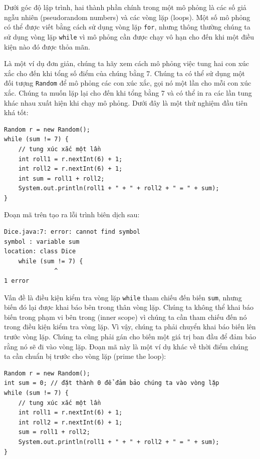 Dưới góc độ lập trình, hai thành phần chính trong một mô phỏng là các số giả ngẫu nhiên (pseudorandom numbers) và các vòng lặp (loops). Một số mô phỏng có thể được viết bằng cách sử dụng vòng lặp \texttt{for}, nhưng thông thường chúng ta sử dụng vòng lặp \texttt{while} vì mô phỏng cần được chạy vô hạn cho đến khi một điều kiện nào đó được thỏa mãn.

Là một ví dụ đơn giản, chúng ta hãy xem cách mô phỏng việc tung hai con xúc xắc cho đến khi tổng số điểm của chúng bằng 7. Chúng ta có thể sử dụng một đối tượng \texttt{Random} để mô phỏng các con xúc xắc, gọi nó một lần cho mỗi con xúc xắc. Chúng ta muốn lặp lại cho đến khi tổng bằng 7 và có thể in ra các lần tung khác nhau xuất hiện khi chạy mô phỏng. Dưới đây là một thử nghiệm đầu tiên khá tốt:

\begin{verbatim}
Random r = new Random();
while (sum != 7) {
    // tung xúc xắc một lần
    int roll1 = r.nextInt(6) + 1;
    int roll2 = r.nextInt(6) + 1;
    int sum = roll1 + roll2;
    System.out.println(roll1 + " + " + roll2 + " = " + sum);
}
\end{verbatim}

Đoạn mã trên tạo ra lỗi trình biên dịch sau:

\begin{verbatim}
Dice.java:7: error: cannot find symbol
symbol : variable sum
location: class Dice
    while (sum != 7) {
              ^
1 error
\end{verbatim}

Vấn đề là điều kiện kiểm tra vòng lặp \texttt{while} tham chiếu đến biến \texttt{sum}, nhưng biến đó lại được khai báo bên trong thân vòng lặp. Chúng ta không thể khai báo biến trong phạm vi bên trong (inner scope) vì chúng ta cần tham chiếu đến nó trong điều kiện kiểm tra vòng lặp. Vì vậy, chúng ta phải chuyển khai báo biến lên trước vòng lặp. Chúng ta cũng phải gán cho biến một giá trị ban đầu để đảm bảo rằng nó sẽ đi vào vòng lặp. Đoạn mã này là một ví dụ khác về thời điểm chúng ta cần chuẩn bị trước cho vòng lặp (prime the loop):

\begin{verbatim}
Random r = new Random();
int sum = 0; // đặt thành 0 để đảm bảo chúng ta vào vòng lặp
while (sum != 7) {
    // tung xúc xắc một lần
    int roll1 = r.nextInt(6) + 1;
    int roll2 = r.nextInt(6) + 1;
    sum = roll1 + roll2;
    System.out.println(roll1 + " + " + roll2 + " = " + sum);
}
\end{verbatim}

